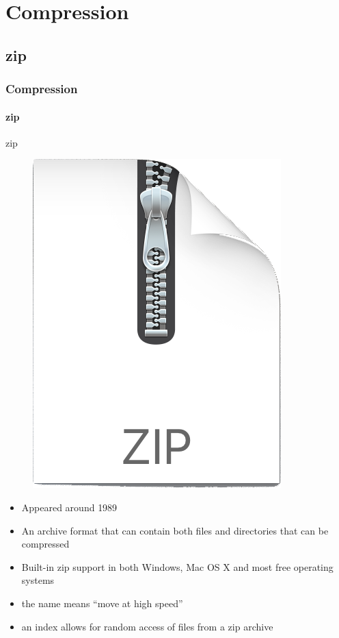 \documentclass[aspectratio=169,usenames,dvipsnames]{beamer}
\begin{document}
\section{Compression}
    \subsection{zip}

    \begin{frame}
        \frametitle{Compression}
        \framesubtitle{zip}
        \begin{block}{zip}
        \begin{figure}
        \centering
        \vspace{-6pt}
        \includegraphics[width=0.55\linewidth]{Figures/zip.png}
        \end{figure}
            \mbox{}
            \begin{itemize}
                \item Appeared around \alert{1989}
                \item An archive format that \alert{can contain both files and directories} that \alert{can be compressed}
            \end{itemize}
            \mbox{}\vspace{-17pt}
            \begin{itemize}
                \item Built-in zip support in both Windows, Mac OS X and most free operating systems
                \item the name means ``move at high speed''
                \item an index allows for \alert{random access} of files from a zip archive
            \end{itemize}

        \end{block}
    \end{frame}
\end{document}
